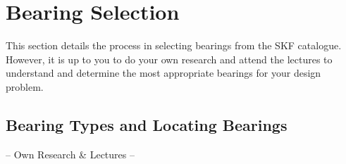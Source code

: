 \section{Bearing Selection}

This section details the process in selecting bearings from the SKF catalogue. However, it is up to you to do your own research and attend the lectures to understand and determine the most appropriate bearings for your design problem.

\subsection{Bearing Types and Locating Bearings}

\begin{framed}
    \vspace{1cm}
    \begin{center}
        \Large
        -- Own Research \& Lectures --
    \end{center}
    \vspace{1cm}
\end{framed}












